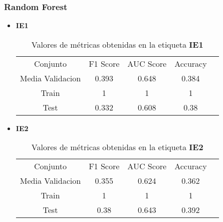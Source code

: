 \subsubsection*{Random Forest}
\begin{itemize}
	\item \textbf{IE1}
	      \begin{table}[H]
		      \centering
		      \begin{tabular}{|c|c|c|c|c}
			      \cline{1-4}
			      Conjunto         & F1 Score & AUC Score & Accuracy \\ \cline{1-4}
			      Media Validacion & 0.393    & 0.648     & 0.384    \\ \cline{1-4}
			      Train            & 1        & 1         & 1        \\ \cline{1-4}
			      Test             & 0.332    & 0.608     & 0.38     \\ \cline{1-4}
		      \end{tabular}
		      \caption{Valores de métricas obtenidas en la etiqueta \textbf{IE1}}
	      \end{table}
	\item  \textbf{IE2}
	      \begin{table}[H]
		      \centering
		      \begin{tabular}{|c|c|c|c|c}
			      \cline{1-4}
			      Conjunto         & F1 Score & AUC Score & Accuracy \\ \cline{1-4}
			      Media Validacion & 0.355    & 0.624     & 0.362    \\ \cline{1-4}
			      Train            & 1        & 1         & 1        \\ \cline{1-4}
			      Test             & 0.38     & 0.643     & 0.392    \\ \cline{1-4}
		      \end{tabular}
		      \caption{Valores de métricas obtenidas en la etiqueta \textbf{IE2}}
	      \end{table}


\end{itemize}

